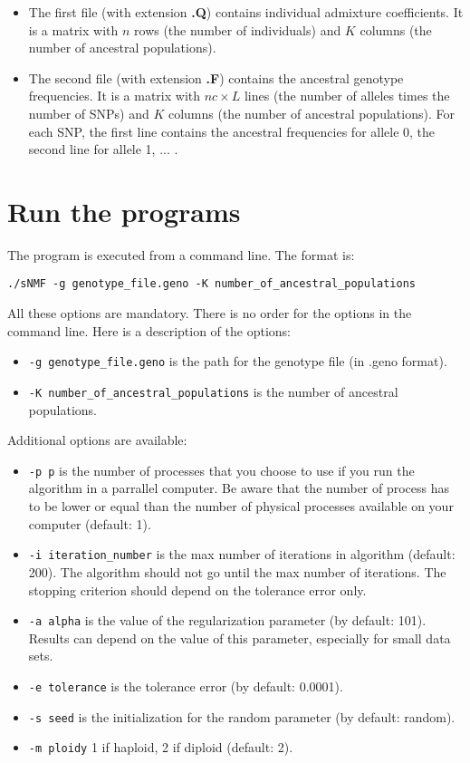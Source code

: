 \documentclass[10pt,a4paper]{article}
\begin{document}
\begin{itemize}
\item The first file (with extension {\bf .Q}) contains individual admixture coefficients.
It is a matrix with $n$ rows (the number of individuals) and $K$ columns (the 
number of ancestral populations).
\item The second file (with extension {\bf .F}) contains the ancestral genotype frequencies.
It is a matrix with $nc\times L$ lines (the number of alleles times the number of SNPs) and $K$ columns (the 
number of ancestral populations). For each SNP, the first line contains the ancestral frequencies for allele 0, the second line for allele 1, ... .
\end{itemize}

\section{Run the programs}
The program is executed from a command line. The format is:
\begin{Verbatim}[frame=single]
./sNMF -g genotype_file.geno -K number_of_ancestral_populations 
\end{Verbatim}

\noindent
All these options are mandatory. There is no order for the options in the command line. 
Here is a description of the options:
\begin{itemize}
\item \verb|-g genotype_file.geno| is the path for the genotype file (in .geno format).
\item \verb|-K number_of_ancestral_populations| is the number of ancestral populations. 
\end{itemize}

\noindent
Additional options are available:
\begin{itemize}
\item \verb|-p p| is the number of processes that you choose to use if you run the algorithm in 
a parrallel computer. Be aware that the number of process has to be lower or equal than the number 
of physical processes available on your computer (default: 1).
\item \verb|-i iteration_number| is the max number of iterations in algorithm (default: 200). 
The algorithm should not go until the max number of iterations. The stopping criterion should 
depend on the tolerance error only.
\item \verb|-a alpha| is the value of the regularization parameter (by default: 101). Results can depend on the value of this parameter, especially for small data sets. 
\item \verb|-e tolerance| is the tolerance error (by default: 0.0001). 
\item \verb|-s seed| is the initialization for the random parameter (by default: random). 
\item \verb|-m ploidy|  1 if haploid, 2 if diploid (default: 2). 
\end{itemize}
\end{document}
